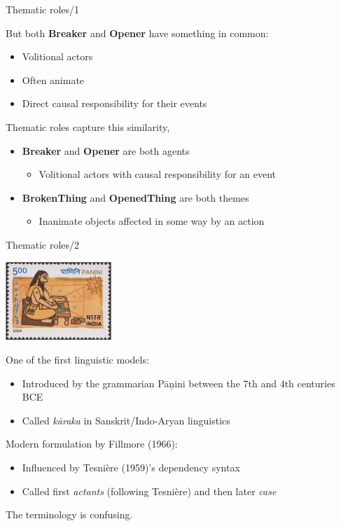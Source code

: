\documentclass[10pt, compress]{beamer}
\begin{document}
\begin{frame}{Thematic roles/1}

But both \textbf{Breaker} and \textbf{Opener} have something in common:
\begin{itemize}
  \item Volitional actors
  \item Often animate
  \item Direct causal responsibility for their events
\end{itemize} 

Thematic roles capture this similarity,
\begin{itemize}
\item \textbf{Breaker} and \textbf{Opener} are both {\sc agents}
\begin{itemize}
  \item Volitional actors with causal responsibility for an event
\end{itemize}
\item \textbf{BrokenThing} and \textbf{OpenedThing} are both {\sc themes}
\begin{itemize}
  \item Inanimate objects affected in some way by an action
\end{itemize}
\end{itemize}

\end{frame}

\begin{frame}{Thematic roles/2}
\begin{flushright}
\includegraphics[width=0.3\textwidth]{graphics/panini.jpg}
\end{flushright}
One of the first linguistic models:
\begin{itemize}
  \item Introduced by the grammarian Pāṇini between the 7th and 4th centuries BCE
  \item Called \emph{kāraka} in Sanskrit/Indo-Aryan linguistics
\end{itemize}

Modern formulation by Fillmore (1966):
\begin{itemize}
  \item Influenced by Tesnière (1959)'s dependency syntax
  \item Called first \emph{actants} (following Tesnière) and then later \emph{case}
\end{itemize}

The terminology is confusing.

\end{frame}
\end{document}

